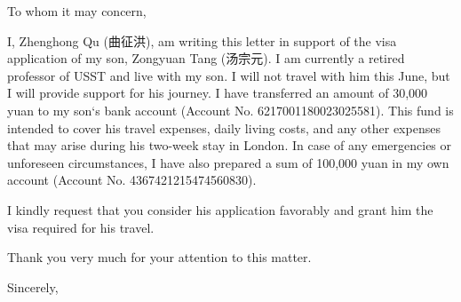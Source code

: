 \documentclass{letter}
\date{March 02, 2024}
\begin{document}
\begin{letter}{}

\opening{To whom it may concern,}

I, Zhenghong Qu (曲征洪), am writing this letter in support of the visa application of my son, Zongyuan Tang (汤宗元). I am currently a retired professor of USST and live with my son. I will not travel with him this June, but I will provide support for his journey. I have transferred an amount of 30,000 yuan to my son`s bank account (Account No. 6217001180023025581). This fund is intended to cover his travel expenses, daily living costs, and any other expenses that may arise during his two-week stay in London. In case of any emergencies or unforeseen circumstances, I have also prepared a sum of 100,000 yuan in my own account (Account No. 4367421215474560830).

I kindly request that you consider his application favorably and grant him the visa required for his travel.

Thank you very much for your attention to this matter.

\closing{Sincerely,}
\end{letter}
\end{document}
